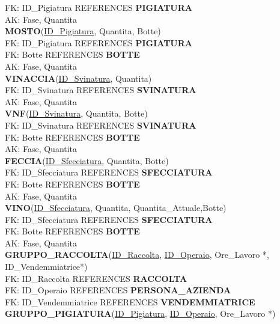 \documentclass{article}
\begin{document}
FK: ID\_Pigiatura REFERENCES \textbf{PIGIATURA}\\
AK: Fase, Quantita \\\newline
\textbf{MOSTO}(\underline{ID\_Pigiatura},  Quantita, Botte)\\
FK: ID\_Pigiatura REFERENCES \textbf{PIGIATURA}\\
FK: Botte REFERENCES \textbf{BOTTE}\\
AK: Fase, Quantita \\\newline
\textbf{VINACCIA}(\underline{ID\_Svinatura},  Quantita)\\
FK: ID\_Svinatura REFERENCES \textbf{SVINATURA}\\
AK: Fase, Quantita \\\newline
\textbf{VNF}(\underline{ID\_Svinatura},  Quantita, Botte)\\
FK: ID\_Svinatura REFERENCES \textbf{SVINATURA}\\
FK: Botte REFERENCES \textbf{BOTTE}\\
AK: Fase, Quantita \\\newline
\textbf{FECCIA}(\underline{ID\_Sfecciatura},  Quantita, Botte)\\
FK: ID\_Sfecciatura REFERENCES \textbf{SFECCIATURA}\\
FK: Botte REFERENCES \textbf{BOTTE}\\
AK: Fase, Quantita \\\newline
\textbf{VINO}(\underline{ID\_Sfecciatura},  Quantita, Quantita\_Attuale,Botte)\\
FK: ID\_Sfecciatura REFERENCES \textbf{SFECCIATURA}\\
FK: Botte REFERENCES \textbf{BOTTE}\\
AK: Fase, Quantita \\\newline
\textbf{GRUPPO\_RACCOLTA}(\underline{ID\_Raccolta}, \underline{ID\_Operaio}, Ore\_Lavoro *, ID\_Vendemmiatrice*)\\
FK: ID\_Raccolta REFERENCES \textbf{RACCOLTA}\\
FK: ID\_Operaio REFERENCES \textbf{PERSONA\_AZIENDA}\\
FK: ID\_Vendemmiatrice REFERENCES \textbf{VENDEMMIATRICE}\\\newline
\textbf{GRUPPO\_PIGIATURA}(\underline{ID\_Pigiatura}, \underline{ID\_Operaio}, Ore\_Lavoro *)\\
\end{document}
